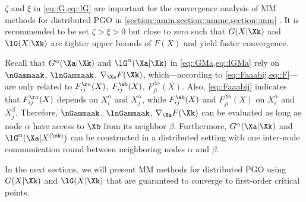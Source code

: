 \begin{remark}
	\highlight
	$\zeta$ and $\xi$  in \cref{eq::G,eq::lG} are important for the convergence analysis of MM methods for distributed PGO in \cref{section::amm,section::ammc,section::mm} . It is  recommended to be set $\zeta>\xi>0$ but close to zero such that $G(X|\Xk)$ and $\lG(X|\Xk)$ are tighter upper bounds of $F(X)$ and yield faster convergence.
\end{remark}

Recall that $G^\alpha(\Xa|\Xk)$ and $\lG^\alpha(\Xa|\Xk)$ in \cref{eq::GMa,eq::lGMa} rely on $\nGammaak$, $\lnGammaak$,
$\nabla_{\Xa} F(\Xk)$, which---according to \cref{eq::Faaabij,eq::F}---are only related to $F_{ij}^{\aa}(X)$, $F_{ij}^{\ab}(X)$, $F_{ji}^{\beta\alpha}(X)$.
Also, \cref{eq::Faaabij} indicates that $F_{ij}^{\aa}(X)$ depends on $X_i^\alpha$ and $X_j^\alpha$, while $F_{ij}^{\ab}(X)$ and $F_{ji}^{\beta\alpha}(X)$ on $X_i^\alpha$ and $X_j^\beta$. Therefore, $\nGammaak$, $\lnGammaak$,
$\nabla_{\Xa} F(\Xk)$ can be evaluated  as long as node $\alpha$ have access to $\Xb$ from its neighbor $\beta$. Furthermore, $G^\alpha(\Xa|\Xk)$ and  $\lG^\alpha(\Xa|X^{(\sk)})$  can be constructed in a distributed setting with one inter-node communication round between neighboring nodes $\alpha$ and $\beta$.

In the next sections, we will present MM methods for distributed PGO using $G(X|\Xk)$ and $\lG(X|\Xk)$ that are guaranteed to converge to first-order critical points.